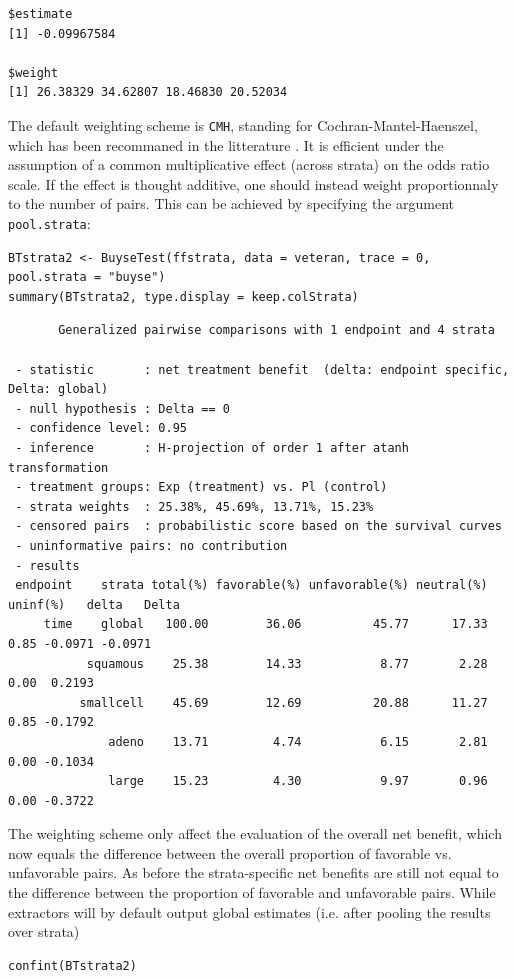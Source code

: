 \documentclass[12pt]{article}
\begin{document}
\begin{verbatim}
$estimate
[1] -0.09967584

$weight
[1] 26.38329 34.62807 18.46830 20.52034
\end{verbatim}




The default weighting scheme is \texttt{CMH}, standing for
Cochran-Mantel-Haenszel, which has been recommaned in the litterature
\citep{dong2018stratified}. It is efficient under the assumption of a
common multiplicative effect (across strata) on the odds ratio
scale. If the effect is thought additive, one should instead weight
proportionnaly to the number of pairs. This can be
achieved by specifying the argument \texttt{pool.strata}:

\lstset{language=r,label= ,caption= ,captionpos=b,numbers=none}
\begin{lstlisting}
BTstrata2 <- BuyseTest(ffstrata, data = veteran, trace = 0, pool.strata = "buyse")
summary(BTstrata2, type.display = keep.colStrata)
\end{lstlisting}

\begin{verbatim}
       Generalized pairwise comparisons with 1 endpoint and 4 strata

 - statistic       : net treatment benefit  (delta: endpoint specific, Delta: global) 
 - null hypothesis : Delta == 0 
 - confidence level: 0.95 
 - inference       : H-projection of order 1 after atanh transformation 
 - treatment groups: Exp (treatment) vs. Pl (control) 
 - strata weights  : 25.38%, 45.69%, 13.71%, 15.23% 
 - censored pairs  : probabilistic score based on the survival curves
 - uninformative pairs: no contribution
 - results
 endpoint    strata total(%) favorable(%) unfavorable(%) neutral(%) uninf(%)   delta   Delta
     time    global   100.00        36.06          45.77      17.33     0.85 -0.0971 -0.0971
           squamous    25.38        14.33           8.77       2.28     0.00  0.2193        
          smallcell    45.69        12.69          20.88      11.27     0.85 -0.1792        
              adeno    13.71         4.74           6.15       2.81     0.00 -0.1034        
              large    15.23         4.30           9.97       0.96     0.00 -0.3722
\end{verbatim}

The weighting scheme only affect the evaluation of the overall net
benefit, which now equals the difference between the overall
proportion of favorable vs. unfavorable pairs. As before the
strata-specific net benefits are still not equal to the difference
between the proportion of favorable and unfavorable pairs. While
extractors will by default output global estimates (i.e. after pooling
the results over strata)
\lstset{language=r,label= ,caption= ,captionpos=b,numbers=none}
\begin{lstlisting}
confint(BTstrata2)
\end{lstlisting}
\end{document}
